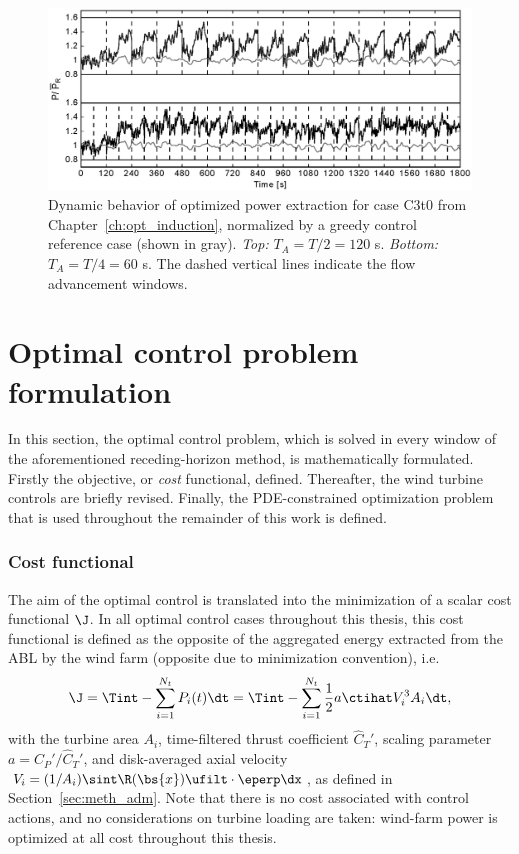 \begin{figure}
	\centering
	\includegraphics[width=\linewidth]{chapters/optimal_control_problem/figure10.eps}
	\caption{Dynamic behavior of optimized power extraction for case C3t0 from Chapter~\ref{ch:opt_induction}, normalized by a greedy control reference case (shown in gray). \emph{Top: } $T_A = T/2 = 120$ s. \emph{Bottom: } $T_A = T/4 = 60$ s. The dashed vertical lines indicate the flow advancement windows.\label{fig:T_A}}
\end{figure}


\section{Optimal control problem formulation}\label{sec:problem_formulation}

In this section, the optimal control problem, which is solved in every window of the aforementioned receding-horizon method, is mathematically formulated. Firstly the objective, or \emph{cost} functional, defined. Thereafter, the wind turbine controls are briefly revised. Finally, the PDE-constrained optimization problem that is used throughout the remainder of this work is defined. 

\subsubsection{Cost functional}
The aim of the optimal control is translated into the minimization of a scalar cost functional $\J$. In all optimal control cases throughout this thesis, this cost functional is defined as the opposite of the aggregated energy extracted from the ABL by the wind farm (opposite due to minimization convention), i.e.
\begin{equation}\label{eq:costfunction}
	\J = \Tint - \sum_{i=1}^{N_t} P_i(t) \dt = \Tint - \sum_{i=1}^{N_t} \frac{1}{2} a \ctihat V_i^3 A_i \dt,
\end{equation}
with the turbine area $A_i$, time-filtered thrust coefficient $\widehat{C}_T'$, scaling parameter $a = C_P'/\widehat{C}_T'$, and disk-averaged axial velocity $V_i = (1/A_i) \sint  \R(\bs{x}) \ufilt \cdot \eperp \dx$, as defined in Section~\ref{sec:meth_adm}. Note that there is no cost associated with control actions, and no considerations on turbine loading are taken: wind-farm power is optimized at all cost throughout this thesis. 

